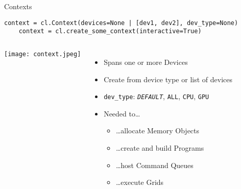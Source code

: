 \begin{frame}[fragile]{Contexts}
  \begin{lstlisting}[gobble=4]
    context = cl.Context(devices=None | [dev1, dev2], dev_type=None)
    context = cl.create_some_context(interactive=True)
  \end{lstlisting}

  \begin{columns}
      \texttt{[image: context.jpeg]}
      \begin{itemize}
        \item Spans one or more Devices
        \item Create from device type or list of devices
        \item \texttt{dev\_type}: 
          \texttt{\textit{DEFAULT}},
          \texttt{ALL}, \texttt{CPU}, \texttt{GPU}
        \item Needed to\dots
          \begin{itemize}
            \item \dots allocate Memory Objects
            \item \dots create and build Programs
            \item \dots host Command Queues
            \item \dots execute Grids
          \end{itemize}
      \end{itemize}
  \end{columns}
\end{frame}

